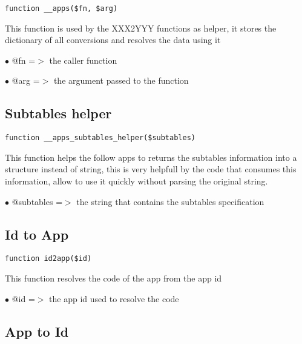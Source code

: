 \documentclass[a4paper]{book}
\begin{document}
\begin{lstlisting}
function __apps($fn, $arg)
\end{lstlisting}

This function is used by the XXX2YYY functions as helper, it stores the
dictionary of all conversions and resolves the data using it

\begin{compactitem}
\item[\color{myblue}$\bullet$] @fn  =$>$ the caller function
\item[\color{myblue}$\bullet$] @arg =$>$ the argument passed to the function
\end{compactitem}

\hypertarget{toc22}{}
\subsection{Subtables helper}

\begin{lstlisting}
function __apps_subtables_helper($subtables)
\end{lstlisting}

This function helps the follow apps to returns the subtables information into
a structure instead of string, this is very helpfull by the code that consumes
this information, allow to use it quickly without parsing the original string.

\begin{compactitem}
\item[\color{myblue}$\bullet$] @subtables =$>$ the string that contains the subtables specification
\end{compactitem}

\hypertarget{toc23}{}
\subsection{Id to App}

\begin{lstlisting}
function id2app($id)
\end{lstlisting}

This function resolves the code of the app from the app id

\begin{compactitem}
\item[\color{myblue}$\bullet$] @id =$>$ the app id used to resolve the code
\end{compactitem}

\hypertarget{toc24}{}
\subsection{App to Id}
\end{document}
